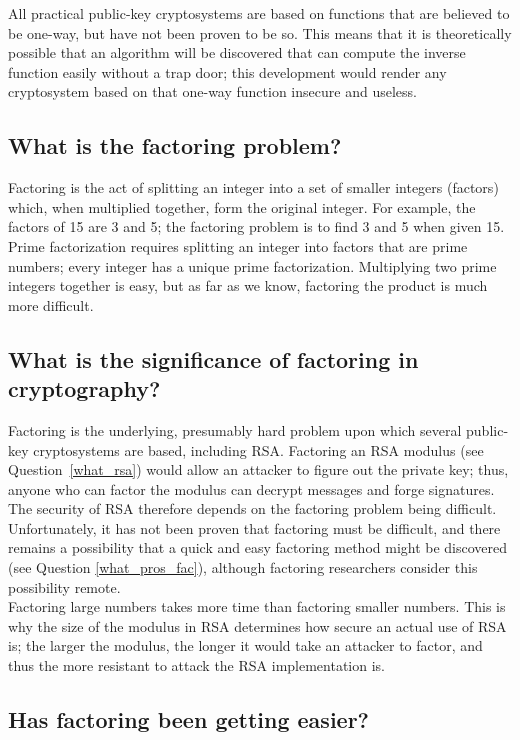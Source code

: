 All practical public-key cryptosystems are based on functions that are
believed to be one-way, but have not been proven to be so. This means
that it is theoretically possible that an algorithm will be discovered
that can compute the inverse function easily without a trap door; this
development would render any cryptosystem based on that one-way
function insecure and useless.

\subsection{What is the factoring problem?}

Factoring is the act of splitting an integer into a set of smaller
integers (factors) which, when multiplied together, form the original
integer. For example, the factors of 15 are 3 and 5; the factoring
problem is to find 3 and 5 when given 15. Prime factorization requires
splitting an integer into factors that are prime numbers; every integer
has a unique prime factorization. Multiplying two prime integers
together is easy, but as far as we know, factoring the product is much
more difficult.

\subsection{What is the significance of factoring in cryptography?}
\label{what_sig_factor}

Factoring is the underlying, presumably hard problem upon which several
public-key cryptosystems are based, including RSA. Factoring an RSA modulus
(see Question~\ref{what_rsa}) would allow an attacker to figure out the
private key; thus, anyone who can factor the modulus can decrypt messages
and forge signatures. The security of RSA therefore depends on the
factoring problem being difficult. Unfortunately, it has not been proven
that factoring must be difficult, and there remains a possibility that a
quick and easy factoring method might be discovered (see Question
\ref{what_pros_fac}), although factoring researchers consider this
possibility remote.\\

Factoring large numbers takes more time than factoring smaller numbers.
This is why the size of the modulus in RSA determines how secure an
actual use of RSA is; the larger the modulus, the longer it would take
an attacker to factor, and thus the more resistant to attack the RSA
implementation is.

\subsection{Has factoring been getting easier?}
\label{has_fac_eas}

